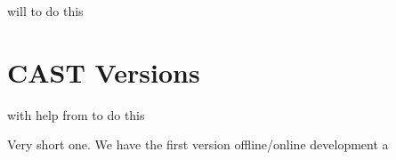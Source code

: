 \documentclass[letterpaper,10pt,english]{sphinxmanual}
\begin{document}
\sphinxAtStartPar
{} will to do this


\chapter{CAST Versions}
\label{\detokenize{contents/ref/version:cast-versions}}\label{\detokenize{contents/ref/version::doc}}
\sphinxAtStartPar
{} with help from  to do this

\sphinxAtStartPar
Very short one.
We have the first version \sphinxhyphen{} offline/online development
a







\renewcommand{\indexname}{Index}
\printindex
\end{document}
